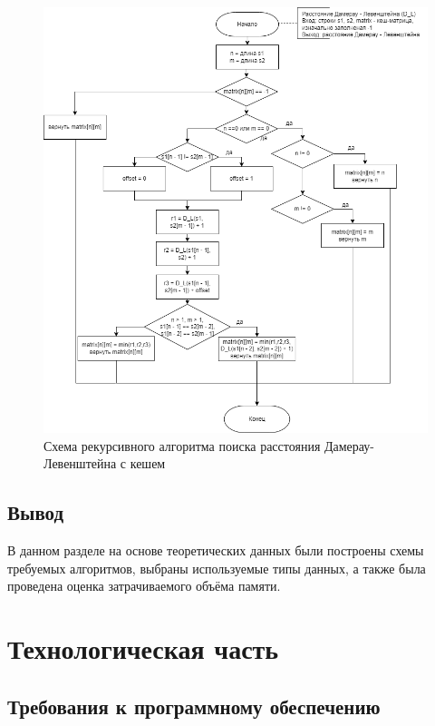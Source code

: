 \documentclass[a4paper,14pt, unknownkeysallowed]{extreport}
\begin{document}
	\begin{figure}
		\centering
		\includegraphics[width=1\linewidth]{DamLevRecCash}
		\caption{Схема рекурсивного алгоритма поиска расстояния Дамерау-Левенштейна с кешем}
		\label{fig:schema_selection}
	\end{figure}

        \clearpage
	\section*{Вывод}
	
	В данном разделе на основе теоретических данных были построены схемы требуемых алгоритмов, выбраны используемые типы данных, а также была проведена оценка затрачиваемого объёма памяти.
	
	\chapter{Технологическая часть}
	
	\section{Требования к программному обеспечению}
	
\end{document}
